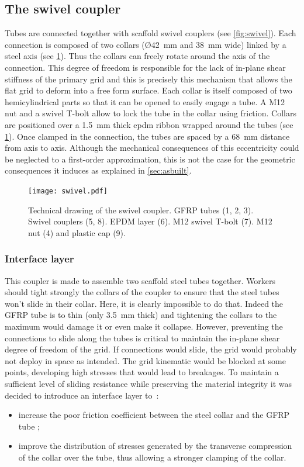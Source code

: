 \subsection{The swivel coupler}\label{sec:swivel}
Tubes are connected together with scaffold swivel couplers (see \cref{fig:swivel}). Each connection is composed of two collars (\O\;\SI{42}{\mm} and \SI{38}{\mm} wide) linked by a steel axis (see \cref{fig:swivel_dwg}). Thus the collars can freely rotate around the axis of the connection. This degree of freedom is responsible for the lack of in-plane shear stiffness of the primary grid and this is precisely this mechanism that allows the flat grid to deform into a free form surface. Each collar is itself composed of two hemicylindrical parts so that it can be opened to easily engage a tube. A M12 nut and a swivel T-bolt allow to lock the tube in the collar using friction. Collars are positioned over a \SI{1.5}{\mm} thick epdm ribbon wrapped around the tubes (see \cref{fig:swivel_dwg}). Once clamped in the connection, the tubes are spaced by a \SI{68}{\mm} distance from axis to axis. Although the mechanical consequences of this eccentricity could be neglected to a first-order approximation, this is not the case for the geometric consequences it induces as explained in \cref{sec:asbuilt}.

\begin{figure}[t]
	\centering
	\texttt{[image: swivel.pdf]}
	\caption[Technical drawing of the swivel coupler]{Technical drawing of the swivel coupler. GFRP tubes (1, 2, 3). Swivel couplers (5, 8). EPDM layer (6). M12 swivel T-bolt (7). M12 nut (4) and plastic cap (9).}
	\label{fig:swivel_dwg}
\end{figure}

\subsubsection{Interface layer}
This coupler is made to assemble two scaffold steel tubes together. Workers should tight strongly the collars of the coupler to ensure that the steel tubes won't slide in their collar. Here, it is clearly impossible to do that. Indeed the GFRP tube is to thin (only \SI{3.5}{\mm} thick) and tightening the collars to the maximum would damage it or even make it collapse. However, preventing the connections to slide along the tubes is critical to maintain the in-plane shear degree of freedom of the grid. If connections would slide, the grid would probably not deploy in space as intended. The grid kinematic would be blocked at some points, developing high stresses that would lead to breakages. To maintain a sufficient level of sliding resistance while preserving the material integrity it was decided to introduce an interface layer to~:
\begin{itemize}
\item increase the poor friction coefficient between the steel collar and the GFRP tube ;
\item improve the distribution of stresses generated by the transverse compression of the collar over the tube, thus allowing a stronger clamping of the collar.
\end{itemize}

